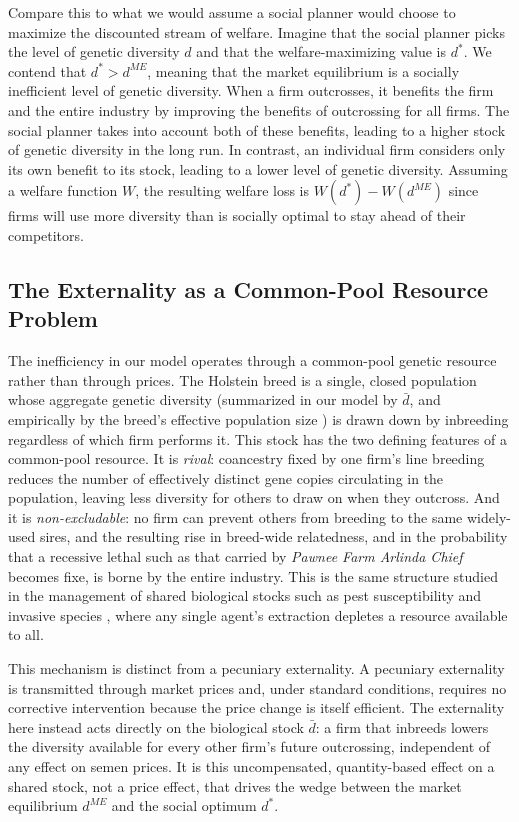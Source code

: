 \documentclass[12pt,letterpaper]{article}
\begin{document}
Compare this to what we would assume a social planner would choose to maximize the discounted stream of welfare.
Imagine that the social planner picks the level of genetic diversity $d$ and that the welfare-maximizing value is $d^*$.
We contend that $d^*>d^{ME}$, meaning that the market equilibrium is a socially inefficient level of genetic diversity.
When a firm outcrosses, it benefits the firm and the entire industry by improving the benefits of outcrossing for all firms. The social planner takes into account both of these benefits, leading to a higher stock of genetic diversity in the long run. In contrast, an individual firm considers only its own benefit to its stock, leading to a lower level of genetic diversity.
Assuming a welfare function $W$, the resulting welfare loss is $W(d^*)-W(d^{ME})$ since firms will use more diversity than is socially optimal to stay ahead of their competitors.

\subsection{The Externality as a Common-Pool Resource Problem}

The inefficiency in our model operates through a common-pool genetic resource rather than through prices. The Holstein breed is a single, closed population whose aggregate genetic diversity (summarized in our model by $\bar{d}$, and empirically by the breed's effective population size \citep{Makanjuola2020}) is drawn down by inbreeding regardless of which firm performs it. This stock has the two defining features of a common-pool resource. It is \emph{rival}: coancestry fixed by one firm's line breeding reduces the number of effectively distinct gene copies circulating in the population, leaving less diversity for others to draw on when they outcross. And it is \emph{non-excludable}: no firm can prevent others from breeding to the same widely-used sires, and the resulting rise in breed-wide relatedness, and in the probability that a recessive lethal such as that carried by \textit{Pawnee Farm Arlinda Chief} \citep{Adams2016} becomes fixe, is borne by the entire industry. This is the same structure studied in the management of shared biological stocks such as pest susceptibility and invasive species \citep{epanchin2015individual}, where any single agent's extraction depletes a resource available to all.

This mechanism is distinct from a pecuniary externality. A pecuniary externality is transmitted through market prices and, under standard conditions, requires no corrective intervention because the price change is itself efficient. The externality here instead acts directly on the biological stock $\bar{d}$: a firm that inbreeds lowers the diversity available for every other firm's future outcrossing, independent of any effect on semen prices. It is this uncompensated, quantity-based effect on a shared stock, not a price effect, that drives the wedge between the market equilibrium $d^{ME}$ and the social optimum $d^{*}$.
\end{document}
